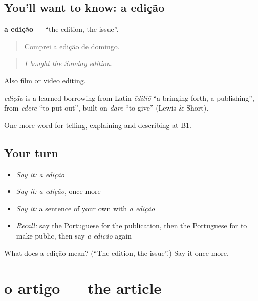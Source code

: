 \subsection*{You'll want to know: a edição}
\textbf{a edição} — \textquotedblleft{}the edition, the issue\textquotedblright{}.

\begin{quote}
Comprei a edição de domingo.
\end{quote}

\begin{quote}
\emph{I bought the Sunday edition.}
\end{quote}

Also film or video editing.

\begin{cousinweb}
\emph{edição} is a learned borrowing from Latin \emph{ēditiō} \textquotedblleft{}a bringing forth, a publishing\textquotedblright{}, from \emph{ēdere} \textquotedblleft{}to put out\textquotedblright{}, built on \emph{dare} \textquotedblleft{}to give\textquotedblright{} (Lewis \& Short).
\end{cousinweb}

\begin{grammarlens}[title={What you've built}]
One more word for telling, explaining and describing at B1.
\end{grammarlens}

\subsection*{Your turn}
\begin{itemize}
\raggedright
  \item \emph{Say it:} \emph{a edição}
  \item \emph{Say it:} \emph{a edição}, once more
  \item \emph{Say it:} a sentence of your own with \emph{a edição}
  \item \emph{Recall:} say the Portuguese for the publication, then the Portuguese for to make public, then say \emph{a edição} again
\end{itemize}

\begin{tcolorbox}[breakable,colback=teal!4,colframe=teal!35!black,title={Before you move on}]
What does a edição mean? (\textquotedblleft{}The edition, the issue\textquotedblright{}.) Say it once more.
\end{tcolorbox}
\section[o artigo]{o artigo — the article}


